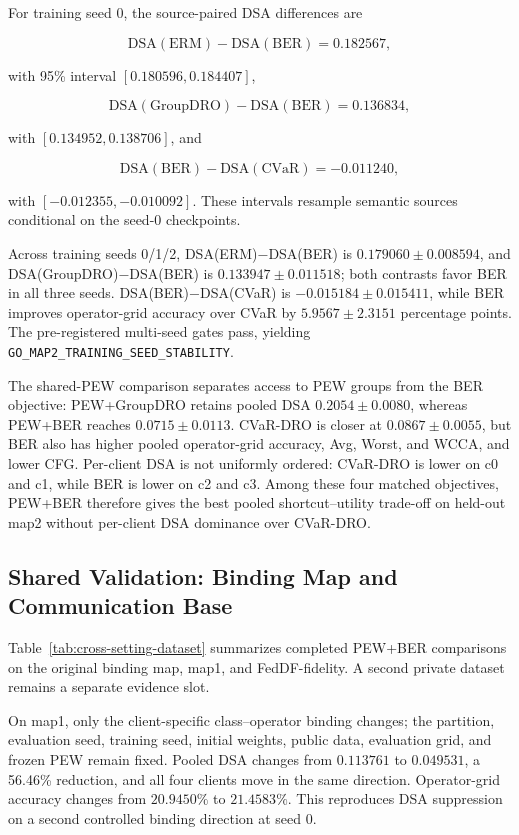 

For training seed 0, the source-paired DSA differences are

\[
\mathrm{DSA(ERM)}-\mathrm{DSA(BER)}=0.182567,
\]

with 95\% interval \([0.180596,0.184407]\),

\[
\mathrm{DSA(GroupDRO)}-\mathrm{DSA(BER)}=0.136834,
\]

with \([0.134952,0.138706]\), and

\[
\mathrm{DSA(BER)}-\mathrm{DSA(CVaR)}=-0.011240,
\]

with \([-0.012355,-0.010092]\). These intervals resample semantic sources conditional on the seed-0 checkpoints.

Across training seeds 0/1/2, DSA(ERM)$-$DSA(BER) is \(0.179060\pm0.008594\), and DSA(GroupDRO)$-$DSA(BER) is \(0.133947\pm0.011518\); both contrasts favor BER in all three seeds. DSA(BER)$-$DSA(CVaR) is \(-0.015184\pm0.015411\), while BER improves operator-grid accuracy over CVaR by \(5.9567\pm2.3151\) percentage points. The pre-registered multi-seed gates pass, yielding \texttt{GO\_MAP2\_TRAINING\_SEED\_STABILITY}.

The shared-PEW comparison separates access to PEW groups from the BER objective: PEW+GroupDRO retains pooled DSA \(0.2054\pm0.0080\), whereas PEW+BER reaches \(0.0715\pm0.0113\). CVaR-DRO is closer at \(0.0867\pm0.0055\), but BER also has higher pooled operator-grid accuracy, Avg, Worst, and WCCA, and lower CFG. Per-client DSA is not uniformly ordered: CVaR-DRO is lower on c0 and c1, while BER is lower on c2 and c3. Among these four matched objectives, PEW+BER therefore gives the best pooled shortcut--utility trade-off on held-out map2 without per-client DSA dominance over CVaR-DRO.

\subsection{Shared Validation: Binding Map and Communication Base}

Table~\ref{tab:cross-setting-dataset} summarizes completed PEW+BER comparisons on the original binding map, map1, and FedDF-fidelity. A second private dataset remains a separate evidence slot.



On map1, only the client-specific class--operator binding changes; the partition, evaluation seed, training seed, initial weights, public data, evaluation grid, and frozen PEW remain fixed. Pooled DSA changes from \(0.113761\) to \(0.049531\), a 56.46\% reduction, and all four clients move in the same direction. Operator-grid accuracy changes from \(20.9450\%\) to \(21.4583\%\). This reproduces DSA suppression on a second controlled binding direction at seed 0.

